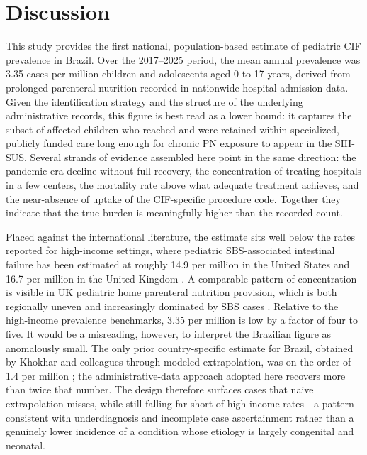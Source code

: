 \documentclass[12pt,a4paper]{article}
\theoremstyle{plain}
\theoremstyle{definition}
\theoremstyle{remark}
\begin{document}
\section{Discussion}\label{sec4}

This study provides the first national, population-based estimate of pediatric CIF prevalence in Brazil. Over the 2017--2025 period, the mean annual prevalence was 3.35 cases per million children and adolescents aged 0 to 17 years, derived from prolonged parenteral nutrition recorded in nationwide hospital admission data. Given the identification strategy and the structure of the underlying administrative records, this figure is best read as a lower bound: it captures the subset of affected children who reached and were retained within specialized, publicly funded care long enough for chronic PN exposure to appear in the SIH-SUS. Several strands of evidence assembled here point in the same direction: the pandemic-era decline without full recovery, the concentration of treating hospitals in a few centers, the mortality rate above what adequate treatment achieves, and the near-absence of uptake of the CIF-specific procedure code. Together they indicate that the true burden is meaningfully higher than the recorded count.

Placed against the international literature, the estimate sits well below the rates reported for high-income settings, where pediatric SBS-associated intestinal failure has been estimated at roughly 14.9 per million in the United States and 16.7 per million in the United Kingdom \cite{khokhar2025global}. A comparable pattern of concentration is visible in UK pediatric home parenteral nutrition provision, which is both regionally uneven and increasingly dominated by SBS cases \cite{beath2011trends}. Relative to the high-income prevalence benchmarks, 3.35 per million is low by a factor of four to five. It would be a misreading, however, to interpret the Brazilian figure as anomalously small. The only prior country-specific estimate for Brazil, obtained by Khokhar and colleagues through modeled extrapolation, was on the order of 1.4 per million \cite{khokhar2025global}; the administrative-data approach adopted here recovers more than twice that number. The design therefore surfaces cases that naive extrapolation misses, while still falling far short of high-income rates---a pattern consistent with underdiagnosis and incomplete case ascertainment rather than a genuinely lower incidence of a condition whose etiology is largely congenital and neonatal.
\end{document}
